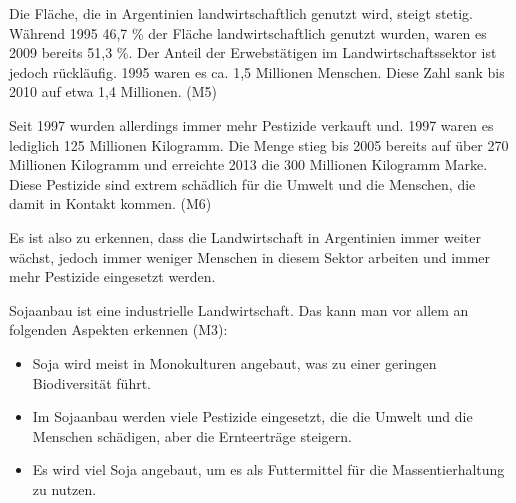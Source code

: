 \documentclass[./entry.tex]{subfiles}
\begin{document}
    Die Fläche, die in Argentinien landwirtschaftlich genutzt wird, steigt stetig.
    Während 1995 46,7 \% der Fläche landwirtschaftlich genutzt wurden, waren es 2009 bereits 51,3 \%.
    Der Anteil der Erwebstätigen im Landwirtschaftssektor ist jedoch rückläufig.
    1995 waren es ca. 1,5 Millionen Menschen. Diese Zahl sank bis 2010 auf etwa 1,4 Millionen. (M5)

    Seit 1997 wurden allerdings immer mehr Pestizide verkauft und.
    1997 waren es lediglich 125 Millionen Kilogramm.
    Die Menge stieg bis 2005 bereits auf über 270 Millionen Kilogramm
    und erreichte 2013 die 300 Millionen Kilogramm Marke.
    Diese Pestizide sind extrem schädlich für die Umwelt und die Menschen,
    die damit in Kontakt kommen. (M6)

    Es ist also zu erkennen, dass die Landwirtschaft in Argentinien immer weiter wächst,
    jedoch immer weniger Menschen in diesem Sektor arbeiten und immer mehr Pestizide eingesetzt werden.

    Sojaanbau ist eine industrielle Landwirtschaft.
    Das kann man vor allem an folgenden Aspekten erkennen (M3):
    \begin{itemize}
        \item Soja wird meist in Monokulturen angebaut, was zu einer geringen Biodiversität führt.
        \item Im Sojaanbau werden viele Pestizide eingesetzt, die die Umwelt und die Menschen schädigen, aber die Ernteerträge steigern.
        \item Es wird viel Soja angebaut, um es als Futtermittel für die Massentierhaltung zu nutzen.
    \end{itemize}
\end{document}
